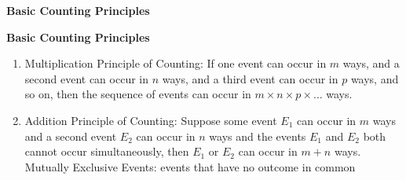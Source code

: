 \begin{center}
\textbf{Basic Counting Principles}
\end{center}

\vspace*{1ex}

\textbf{Basic Counting Principles}
\begin{enumerate}[label = \arabic*. ]
\item Multiplication Principle of Counting:  If one event can occur in $m$ ways,  and a second event can occur in $n$ ways, and a third event can occur in $p$ ways, and so on, then the sequence of events can occur in $m \times n \times p \times \ldots$ ways.

\item Addition Principle of Counting: Suppose some event $E_1$ can occur in $m$ ways and a second event $E_2$ can occur in $n$ ways and the events $E_1$ and $E_2$ both cannot occur simultaneously, then $E_1$ or $E_2$ can occur in $m + n$ ways. \\
Mutually Exclusive Events: events that have no outcome in common
\end{enumerate} 